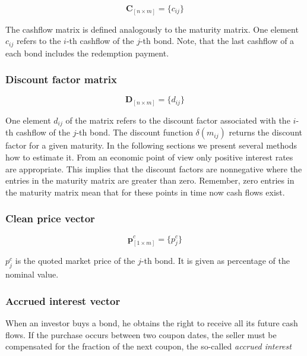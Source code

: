  \begin{equation*}\label{cashflowm}
\bm{C}_{\left[n\times m\right]}= \{c_{ij}\}
\end{equation*}

The cashflow matrix is defined analogously to the maturity matrix. One element $c_{ij}$ refers to the $i$-th cashflow of the $j$-th bond. Note, that the last cashflow of a each bond includes the redemption payment.

\subsubsection*{Discount factor matrix}

 \begin{equation*}\label{discountm}
\bm{D}_{\left[n\times m\right]}= \{d_{ij}\}
\end{equation*}

One element $d_{ij}$ of the matrix refers to the discount factor associated with the $i$-th cashflow of the $j$-th bond. The discount function $\delta(m_{ij})$ returns the discount factor for a given maturity. In the following sections we present several methods how to estimate it. From an economic point of view only positive interest rates are appropriate. This implies that the discount factors are nonnegative where the entries in the maturity matrix are greater than zero. Remember, zero entries in the maturity matrix mean that for these points in time now cash flows exist.

\subsubsection*{Clean price vector}

 \begin{equation*}\label{pc}
\bm{p}^c_{\left[1\times m\right]}= \{p^c_j\}
\end{equation*}

$p_{j}^c$ is the quoted market price of the $j$-th bond. It is given as percentage of the nominal value.

\subsubsection*{Accrued interest vector}

When an investor buys a bond, he obtains the right to receive all its future cash flows. If the purchase occurs between two coupon dates, the seller must be compensated for the fraction of the next coupon, the so-called \emph{accrued interest}

